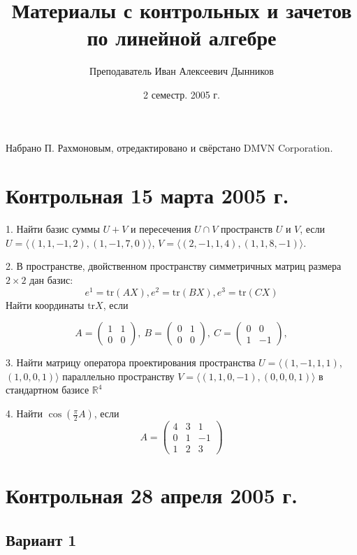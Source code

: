\documentclass[a4paper]{article}
\title{Материалы с контрольных и зачетов по линейной алгебре}
\author{Преподаватель Иван Алексеевич Дынников}
\date{2 семестр. 2005 г.}
\begin{document}
\maketitle
\centerline{\small Набрано П. Рахмоновым, отредактировано и свёрстано DMVN Corporation.}

\medskip
\dmvntrail

\section{Контрольная 15 марта 2005 г.}

1. Найти базис суммы $U+V$ и пересечения $U\cap V$ пространств $U$
и $V$, если $U=\langle(1, 1, -1, 2), (1, -1, 7, 0)\rangle$,
$V=\langle(2, -1, 1, 4), (1, 1, 8, -1)\rangle$.

2. В пространстве, двойственном пространству симметричных матриц
размера $2\times 2$ дан базис:
$$
e^1=\text{tr}(AX), e^2=\text{tr}(BX), e^3=\text{tr}(CX)
$$
Найти координаты $\text{tr} X$, если

$$
A= \left(
\begin{array}{cc}
1 & 1\\
0 & 0
\end{array} \right) ,\ B= \left(
\begin{array}{cc}
0 & 1\\
0 & 0
\end{array} \right),\ C=\left(
\begin{array}{cc}
0 & 0\\
1 & -1
\end{array} \right),
$$


3. Найти матрицу оператора проектирования пространства
$U=\langle(1, -1, 1, 1)$, $(1, 0, 0, 1)\rangle$ параллельно
пространству $V=\langle(1, 1, 0, -1), (0, 0, 0, 1)\rangle$ в
стандартном базисе $\mathbb{R}^4$

4. Найти $\cos(\frac{\pi}{2}A)$, если $$ A= \left(
\begin{array}{ccc}
4 & 3 & 1\\
0 & 1 & -1 \\
1 & 2 & 3
\end{array} \right)  $$

\section{Контрольная 28 апреля 2005 г.}

\subsection{Вариант 1}
\end{document}
